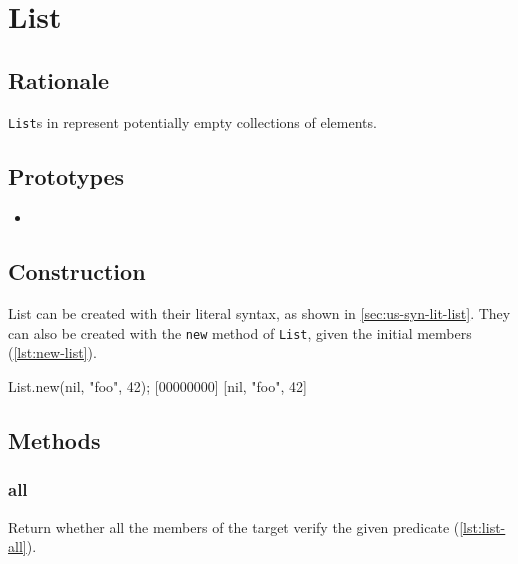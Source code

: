 \section{List}
\subsection{Rationale}

\lstinline|List|s in \us represent potentially empty collections of
elements.

\subsection{Prototypes}

\begin{itemize}
\item {}
\end{itemize}

\subsection{Construction}

List can be created with their literal syntax, as shown in
\autoref{sec:us-syn-lit-list}. They can also be created with the
\lstinline|new| method of \lstinline|List|, given the initial members
(\autoref{lst:new-list}).

\begin{urbiscript}[caption=List.new, label=lst:new-list]
List.new(nil, "foo", 42);
[00000000] [nil, "foo", 42]
\end{urbiscript}

\subsection{Methods}

\subsubsection{all}

Return whether all the members of the target verify the given
predicate (\autoref{lst:list-all}).


